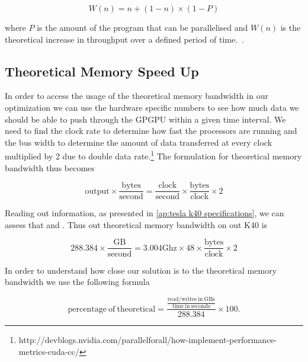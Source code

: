 \begin{equation}
  \label{eq:gustafson-barsis law}
  W(n) = n + (1-n) \times (1-P)
\end{equation}

where $P$ is the amount of the program that can be parallelised and $W(n)$ is the theoretical increase in throughput over a defined period of time.~\cite{gustafson1988reevaluating}.

\subsection{Theoretical Memory Speed Up}
\label{sec:analysing hardware}
In order to access the usage of the theoretical memory bandwidth in our optimization we can use the hardware specific numbers to see how much data we should be able to push through the GPGPU within a given time interval.
We need to find the clock rate to determine how fast the processors are running and the bus width to determine the amount of data transferred at every clock multiplied by 2 due to double data rate.\footnote{http://devblogs.nvidia.com/parallelforall/how-implement-performance-metrics-cuda-cc/}
The formulation for theoretical memory bandwidth thus becomes

\[
  \mathrm{output} \times \frac{\mathrm{bytes}}{\mathrm{second}} = \frac{\mathrm{clock}}{\mathrm{second}} \times \frac{\mathrm{bytes}}{\mathrm{clock}} \times 2
\]

Reading out  information, as presented in \cref{ap:tesla k40 specifications}, we can assess that  and .
Thus out theoretical memory bandwidth on out K40 is

\[
  288.384 \times \frac{\mathrm{GB}}{\mathrm{second}} = 3.004 \mathrm{Ghz} \times 48 \times \frac{\mathrm{bytes}}{\mathrm{clock}} \times 2
\]

In order to understand how close our solution is to the theoretical memory bandwidth we use the following formula

\[
  \mathrm{percentage\ of\ theoretical} = \frac{\frac{\mathrm{read/writes\ in\ GBs}}{\mathrm{time\ in\ seconds}}}{288.384} \times 100.
\]
